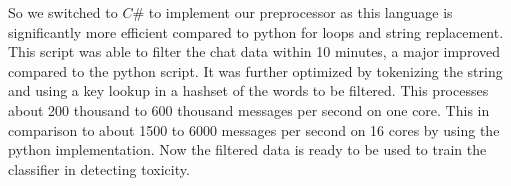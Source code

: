 \documentclass[final]{report}
\begin{document}
So we switched to $C\#$ to implement our preprocessor as this language is significantly more efficient compared to python for loops and string replacement.
This script was able to filter the chat data within 10 minutes, a major improved compared to the python script.
It was further optimized by tokenizing the string and using a key lookup in a hashset of the words to be filtered.
This processes about 200 thousand to 600 thousand messages per second on one core.
This in comparison to about 1500 to 6000 messages per second on 16 cores by using the python implementation.
Now the filtered data is ready to be used to train the classifier in detecting toxicity.
\end{document}
